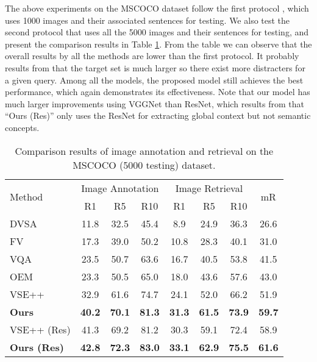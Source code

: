 \documentclass[10pt,twocolumn,letterpaper]{article}
\begin{document}
The above experiments on the MSCOCO dataset follow
the first protocol \cite{karpathy2014vsa},
which uses 1000 images and their associated sentences for testing.
We also test the second protocol that uses all the 5000 images and their sentences
for testing,
and present the comparison results in Table \ref{table:coco5k}.
From the table we can observe that
the overall results by all the methods are lower
than the first protocol.
It probably results from that the target set is much larger
so there exist more distracters for a given query.
Among all the models, the proposed model still achieves the best performance, which again
demonstrates its effectiveness.
Note that our model has much larger improvements using VGGNet than ResNet, which results from
that ``Ours (Res)'' only uses the ResNet for extracting global context
but not semantic concepts.




\begin{table}[t] \small
\addtolength{\tabcolsep}{-3pt}
\centering
\caption{Comparison results of image annotation and retrieval on the MSCOCO (5000 testing) dataset. }
\begin{tabular}{l|ccc|ccc|c}
\hline
\hline
\multirow{2}{0.7cm}{Method}     &  \multicolumn{3}{c|}{Image Annotation}  &  \multicolumn{3}{c|}{Image Retrieval} & \multirow{2}{0.5cm}{{mR}}  \\
\cline{2-7}
     & R1 & R5  & R10  & R1 & R5  & R10  &    \\
\hline

DVSA \cite{karpathy2014vsa}               &11.8 &32.5 &45.4  &8.9 &24.9 &36.3  &26.6 \\
FV\cite{klein2015associating}  &17.3 &39.0 &50.2  &10.8 &28.3 &40.1  &31.0\\
VQA \cite{lin2016leveraging}              &23.5 &50.7 &63.6   &16.7 &40.5 &53.8   & 41.5\\
OEM \cite{vendrov2015order}               &23.3 &50.5 &65.0 &18.0 &43.6   &57.6  &43.0\\
VSE++ \cite{faghri2017vse++}              &32.9 &61.6  &74.7   &24.1 &52.0 &66.2   & 51.9\\
\textbf{Ours}  &\bf{40.2} &\bf{70.1} &\bf{81.3}  &\bf{31.3} &\bf{61.5} &\bf{73.9}  & \bf{59.7}\\

\hline
VSE++ (Res) \cite{faghri2017vse++}      &41.3 &69.2  &81.2   &30.3 &59.1 &72.4  & 58.9\\
\textbf{Ours (Res)} &\bf{42.8} &\bf{72.3} &\bf{83.0} &\bf{33.1} &\bf{62.9} &\bf{75.5}  &\bf{61.6} \\

\hline
\hline
\end{tabular}
\label{table:coco5k}
\end{table}
\end{document}

